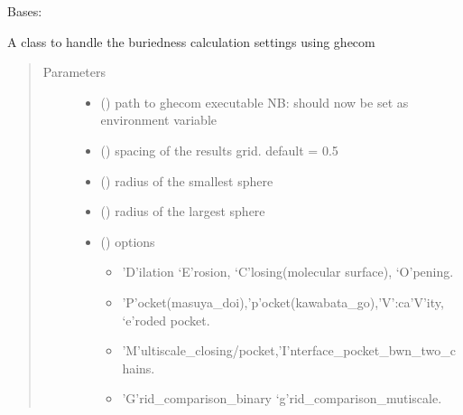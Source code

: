 \documentclass[letterpaper,10pt,english]{sphinxmanual}
\begin{document}
\begin{fulllineitems}
\begin{fulllineitems}
\label{\detokenize{calculation_api:hotspots.calculation.Buriedness.Settings}}
Bases: 

A class to handle the buriedness calculation settings using ghecom
\begin{quote}\begin{description}
\item[{Parameters}] \leavevmode\begin{itemize}
\item {} 
 () \textendash{} path to ghecom executable NB: should now be set as environment variable

\item {} 
 () \textendash{} spacing of the results grid. default = 0.5

\item {} 
 () \textendash{} radius of the smallest sphere

\item {} 
 () \textendash{} radius of the largest sphere

\item {} 
 () \textendash{} 
options
\begin{itemize}
\item {} 
’D’ilation ‘E’rosion, ‘C’losing(molecular surface), ‘O’pening.

\item {} 
’P’ocket(masuya\_doi),’p’ocket(kawabata\_go),’V’:ca’V’ity, ‘e’roded pocket.

\item {} 
’M’ultiscale\_closing/pocket,’I’nterface\_pocket\_bwn\_two\_chains.

\item {} 
’G’rid\_comparison\_binary ‘g’rid\_comparison\_mutiscale.


\end{itemize}
\end{itemize}
\end{description}
\end{quote}
\end{fulllineitems}
\end{fulllineitems}
\end{document}
